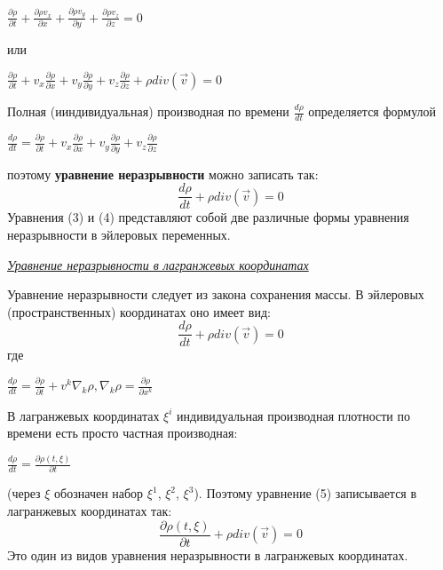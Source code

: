 \begin{center}$
\frac{\partial \rho}{\partial t} + \frac{\partial \rho v_x}{\partial x} + \frac{\partial \rho v_y}{\partial y} + \frac{\partial \rho v_z}{\partial z} = 0
$\end{center}
или
\begin{center}$
\frac{\partial \rho}{\partial t} + v_x \frac{\partial \rho}{\partial x} + v_y \frac{\partial \rho}{\partial y} + v_z \frac{\partial \rho}{\partial z} + \rho div (\Vec{v}) = 0
$\end{center}
Полная (ииндивидуальная) производная по времени $\frac{d \rho}{d t}$ определяется формулой
\begin{center}$
\frac{d \rho}{d t} = \frac{\partial \rho}{\partial t} + v_x \frac{\partial \rho}{\partial x} + v_y \frac{\partial \rho}{\partial y} + v_z \frac{\partial \rho}{\partial z}
$\end{center}
поэтому \textbf{уравнение неразрывности} можно записать так:
\begin{equation}
    \frac{d \rho}{d t} + \rho div(\Vec{v}) = 0
\end{equation}
Уравнения (3) и (4) представляют собой две различные формы уравнения неразрывности в эйлеровых переменных.

\begin{center}
    \textit{\underline{Уравнение неразрывности в лагранжевых координатах}}
\end{center}
Уравнение неразрывности следует из закона сохранения массы. В эйлеровых (пространственных) координатах оно имеет вид:
\begin{equation}
    \frac{d \rho}{d t} + \rho div(\Vec{v}) = 0
\end{equation}
где
\begin{center}$
\frac{d \rho}{d t} = \frac{\partial \rho}{\partial t} + v^k \nabla_k \rho,
\nabla_k \rho = \frac{\partial \rho}{\partial x^k}
$\end{center}
В лагранжевых координатах $\xi^i$ индивидуальная производная плотности по времени есть просто частная производная:
\begin{center}$
\frac{d \rho}{d t}  = \frac{\partial \rho (t, \xi)}{\partial t}
$\end{center}
(через $\xi$ обозначен набор $\xi^1$, $\xi^2$, $\xi^3$). Поэтому уравнение (5) записывается в лагранжевых координатах так:
\begin{equation}
    \frac{\partial \rho (t, \xi)}{\partial t} + \rho div(\Vec{v}) = 0
\end{equation}
Это один из видов уравнения неразрывности в лагранжевых координатах.